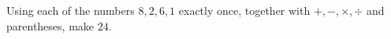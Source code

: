 Using each of the numbers $8,2,6,1$ exactly once, together with $+,-,\times,\div$ and parentheses, make $24$.
